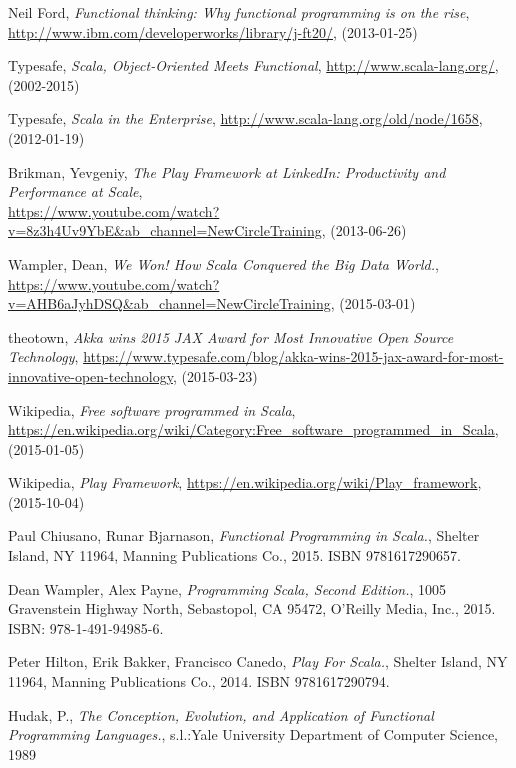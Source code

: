 \documentclass[12pt,twoside,a4paper]{report}
\begin{document}

\begin{thebibliography}{99}

Neil Ford,
\emph{Functional thinking: Why functional programming is on the rise},
\url{http://www.ibm.com/developerworks/library/j-ft20/},
(2013-01-25)

Typesafe,
\emph{Scala, Object-Oriented Meets Functional},
\url{http://www.scala-lang.org/},
(2002-2015)
	
Typesafe,
\emph{Scala in the Enterprise},
\url{http://www.scala-lang.org/old/node/1658},
(2012-01-19)

Brikman, Yevgeniy,
\emph{The Play Framework at LinkedIn: Productivity and Performance at Scale},\\
\url{https://www.youtube.com/watch?v=8z3h4Uv9YbE&ab_channel=NewCircleTraining},
(2013-06-26)

Wampler, Dean,
\emph{We Won! How Scala Conquered the Big Data World.},
\url{https://www.youtube.com/watch?v=AHB6aJyhDSQ&ab_channel=NewCircleTraining},
(2015-03-01)

theotown,
\emph{Akka wins 2015 JAX Award for Most Innovative Open Source Technology},
\url{https://www.typesafe.com/blog/akka-wins-2015-jax-award-for-most-innovative-open-technology},
(2015-03-23)
	
Wikipedia,
\emph{Free software programmed in Scala},
\url{https://en.wikipedia.org/wiki/Category:Free_software_programmed_in_Scala},
(2015-01-05)
	
Wikipedia,
\emph{Play Framework},
\url{https://en.wikipedia.org/wiki/Play_framework},
(2015-10-04)
	
Paul Chiusano, Runar Bjarnason,
\emph{Functional Programming in Scala.},
Shelter Island, NY 11964,
Manning Publications Co., 2015. ISBN 9781617290657.

Dean Wampler, Alex Payne,
\emph{Programming Scala, Second Edition.},
1005 Gravenstein Highway North, Sebastopol, CA 95472,
O’Reilly Media, Inc., 2015. ISBN: 978-1-491-94985-6.
	
Peter Hilton, Erik Bakker, Francisco Canedo,
\emph{Play For Scala.},
Shelter Island, NY 11964,
Manning Publications Co., 2014. ISBN 9781617290794.

Hudak, P.,
\emph{The Conception, Evolution, and Application of Functional Programming Languages.},
s.l.:Yale University Department of Computer Science,
1989


\end{thebibliography}
\end{document}
